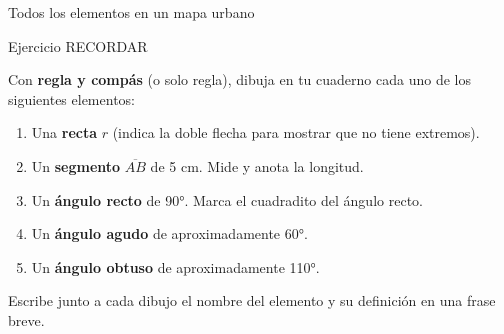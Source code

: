 \documentclass[aspectratio=169, 10pt, spanish]{beamer}
\begin{document}
\begin{frame}{Todos los elementos en un mapa urbano}
\begin{center}
  \end{center}
\end{frame}


\begin{frame}{Ejercicio RECORDAR}
  \quad{}
  \vspace{4pt}
  \begin{recordarbox}
    \AlmFontFootnote
    Con \textbf{regla y compás} (o solo regla), dibuja en
    tu cuaderno cada uno de los siguientes elementos:
    \begin{enumerate}
      \item Una \textbf{recta} $r$ (indica la doble flecha
            para mostrar que no tiene extremos).
      \item Un \textbf{segmento} $\overline{AB}$ de 5 cm.
            Mide y anota la longitud.
      \item Un \textbf{ángulo recto} de 90°.
            Marca el cuadradito del ángulo recto.
      \item Un \textbf{ángulo agudo} de aproximadamente 60°.
      \item Un \textbf{ángulo obtuso} de aproximadamente 110°.
    \end{enumerate}
    \vspace{4pt}
    Escribe junto a cada dibujo el nombre del elemento
    y su definición en una frase breve.
  \end{recordarbox}
\end{frame}
\end{document}
